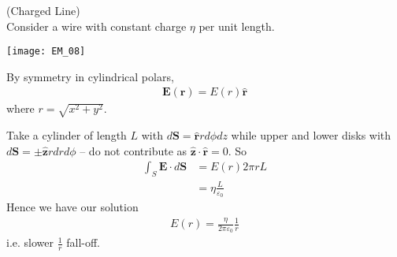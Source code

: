\documentclass[a4paper]{article}
\begin{document}
\begin{eg} (Charged Line)\\
Consider a wire with constant charge $\eta$ per unit length.

\texttt{[image: EM\_08]}

By symmetry in cylindrical polars,
\begin{equation*}
\begin{aligned}
\mathbf{E}(\mathbf{r}) = E(r) \mathbf{\hat{r}}
\end{aligned}
\end{equation*}
where $r = \sqrt{x^2+y^2}$.

Take a cylinder of length $L$ with $d\mathbf{S} = \mathbf{\hat{r}} rd\phi dz$ while upper and lower disks with $d\mathbf{S} = \pm \mathbf{\hat{z}}r dr d\phi$ -- do not contribute as $\mathbf{\hat{z}} \cdot \mathbf{\hat{r}} = 0$. So
\begin{equation*}
\begin{aligned}
\int_S \mathbf{E} \cdot d\mathbf{S} &= E(r)2\pi r L\\
&=\eta \frac{L}{\varepsilon_0}
\end{aligned}
\end{equation*}
Hence we have our solution
\begin{equation*}\tag{2.5} \label{eq:2.5}
\begin{aligned}
E(r) = \frac{\eta}{2\pi \varepsilon_0} \frac{1}{r}
\end{aligned}
\end{equation*}
i.e. slower $\frac{1}{r}$ fall-off.

\end{eg}
\end{document}
